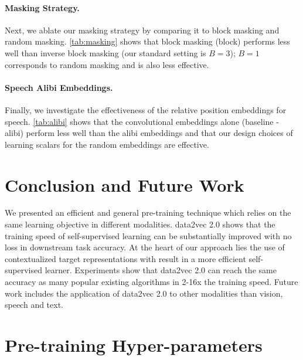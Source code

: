\documentclass[nohyperref]{article}
\theoremstyle{plain}
\theoremstyle{definition}
\theoremstyle{remark}
\newcommand{\name}{data2vec 2.0}
\begin{document}
\paragraph{Masking Strategy.}
Next, we ablate our masking strategy by comparing it to block masking and random masking. 
\autoref{tab:masking} shows that block masking (block) performs less well than inverse block masking (our standard setting is $B=3$); $B=1$ corresponds to random masking and is also less effective.

\paragraph{Speech Alibi Embeddings.}
Finally, we investigate the effectiveness of the relative position embeddings for speech.
\autoref{tab:alibi} shows that the convolutional embeddings alone (baseline - alibi) perform less well than the alibi embeddings and that our design choices of learning scalars for the random embeddings are effective. 


\section{Conclusion and Future Work}
We presented an efficient and general pre-training technique which relies on the same learning objective in different modalities. 
\name{} shows that the training speed of self-supervised learning can be substantially improved with no loss in downstream task accuracy.
At the heart of our approach lies the use of contextualized target representations with result in a more efficient self-supervised learner.
Experiments show that \name{} can reach the same accuracy as many popular existing algorithms in 2-16x the training speed.
Future work includes the application of \name{} to other modalities than vision, speech and text. 



















\newpage
\appendix
\onecolumn

\section{Pre-training Hyper-parameters}
\label{appendix:hyper}
\end{document}
